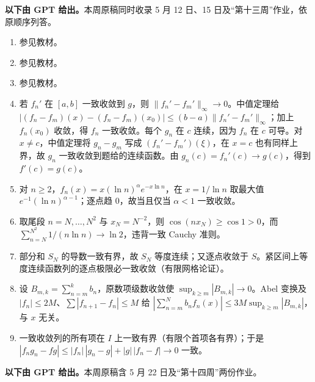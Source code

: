 \noindent\textbf{以下由 GPT 给出。}本周原稿同时收录 5 月 12 日、15 日及“第十三周”作业，依原顺序列答。
\begin{enumerate}
\item 参见教材。
\item 参见教材。
\item 参见教材。
\item 若 $f_n'$ 在 $[a,b]$ 一致收敛到 $g$，则 $\lVert{}f_n'-f_m'\rVert_\infty\to0$。中值定理给 $|(f_n-f_m)(x)-(f_n-f_m)(x_0)|\le(b-a)\lVert{}f_n'-f_m'\rVert_\infty$；加上 $f_n(x_0)$ 收敛，得 $f_n$ 一致收敛。每个 $g_n$ 在 $c$ 连续，因为 $f_n$ 在 $c$ 可导。对 $x\ne c$，中值定理将 $g_n-g_m$ 写成 $(f_n'-f_m')(\xi)$，在 $x=c$ 也有同样上界，故 $g_n$ 一致收敛到题给的连续函数。由 $g_n(c)=f_n'(c)\to g(c)$，得到 $f'(c)=g(c)$。
\item 对 $n\ge2$，$f_n(x)=x(\ln n)^\alpha e^{-x\ln n}$，在 $x=1/\ln n$ 取最大值 $e^{-1}(\ln n)^{\alpha-1}$；逐点趋 $0$，故当且仅当 $\alpha<1$ 一致收敛。
\item 取尾段 $n=N,\ldots,N^2$ 与 $x_N=N^{-2}$，则 $\cos(nx_N)\ge\cos1>0$，而 $\sum_{n=N}^{N^2}1/(n\ln n)\to\ln2$，违背一致 Cauchy 准则。
\item 部分和 $S_N$ 的导数一致有界，故 $S_N$ 等度连续；又逐点收敛于 $S$。紧区间上等度连续函数列的逐点极限必一致收敛（有限网格论证）。
\item 设 $B_{m,k}=\sum_{n=m}^kb_n$，原数项级数收敛使 $\sup_{k\ge m}|B_{m,k}|\to0$。Abel 变换及 $|f_n|\le2M$、$\sum|f_{n+1}-f_n|\le M$ 给 $|\sum_{n=m}^Nb_nf_n(x)|\le3M\sup_{k\ge m}|B_{m,k}|$，与 $x$ 无关。
\item 一致收敛列的所有项在 $I$ 上一致有界（有限个首项各有界）；于是 $|f_ng_n-fg|\le|f_n|\,|g_n-g|+|g|\,|f_n-f|\to0$ 一致。
\end{enumerate}
\noindent\textbf{以下由 GPT 给出。}本周原稿含 5 月 22 日及“第十四周”两份作业。
